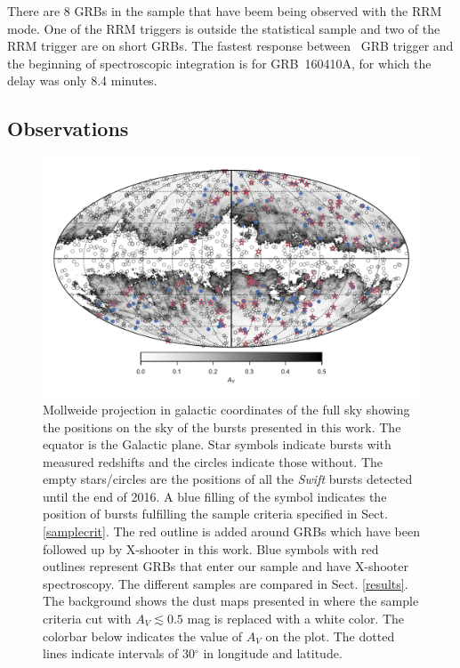 \documentclass{aa}    %
\begin{document}
There are 8 GRBs in the sample that have beem being observed with the RRM mode.
One of the RRM triggers is outside the statistical sample and two of the RRM
trigger are on short GRBs. The fastest response between \swift~GRB trigger and
the beginning of spectroscopic integration is for GRB~160410A, for which the
delay was only 8.4 minutes.


\subsection{Observations} \label{obs}


\begin{figure}
	\centerline{\includegraphics{figures/skymap.pdf}} \caption{Mollweide projection
	in galactic coordinates of the full sky showing the positions on the sky of the
	bursts presented in this work. The equator is the Galactic plane. Star symbols
	indicate bursts with measured redshifts and the circles indicate those without.
	The empty stars/circles are the positions of all the \textit{Swift} bursts
	detected until the end of 2016. A blue filling of the symbol indicates the
	position of bursts fulfilling the sample criteria specified in Sect.
	\ref{samplecrit}. The red outline is added around GRBs which have been followed
	up by X-shooter in this work. Blue symbols with red outlines represent GRBs
	that enter our sample and have X-shooter spectroscopy. The different samples
	are compared in Sect. \ref{results}. The background shows the dust maps
	presented in \citet{Schlegel1998} where the sample criteria cut with $A_V
	\lesssim 0.5$ mag is replaced with a white color. The colorbar below indicates
	the value of $A_V$ on the plot. The dotted lines indicate intervals of
	30$^\circ$ in longitude and latitude.} \label{fig:skymap}
\end{figure}
\end{document}
